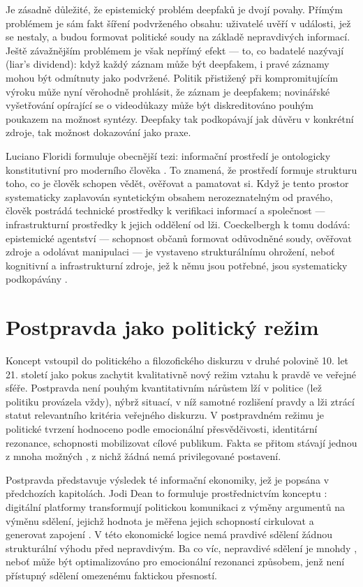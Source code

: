 Je zásadně důležité, že epistemický problém deepfaků je dvojí povahy.
Přímým problémem je sám fakt šíření podvrženého obsahu: uživatelé uvěří v události, jež se nestaly, a budou formovat politické soudy na základě nepravdivých informací. Ještě závažnějším problémem je však nepřímý efekt — to, co badatelé nazývají  (liar's dividend): když každý záznam může být deepfakem, i pravé záznamy mohou být odmítnuty jako podvržené. Politik přistižený při kompromitujícím výroku může nyní věrohodně prohlásit, že záznam je deepfakem; novinářské vyšetřování opírající se o videodůkazy může být diskreditováno pouhým poukazem na možnost syntézy. Deepfaky tak podkopávají jak důvěru v konkrétní zdroje, tak možnost dokazování jako praxe.

Luciano Floridi formuluje obecnější tezi: informační prostředí je ontologicky konstitutivní pro moderního člověka \parencite{Floridi23}. To znamená, že prostředí formuje strukturu toho, co je člověk schopen vědět, ověřovat a pamatovat si. Když je tento prostor systematicky zaplavován syntetickým obsahem nerozeznatelným od pravého, člověk postrádá technické prostředky k verifikaci informací a společnost — infrastrukturní prostředky k jejich oddělení od lži. Coeckelbergh k tomu dodává: epistemické agentství — schopnost občanů formovat odůvodněné soudy, ověřovat zdroje a odolávat manipulaci — je vystaveno strukturálnímu ohrožení, neboť kognitivní a infrastrukturní zdroje, jež k němu jsou potřebné, jsou systematicky podkopávány \parencite{Coeckelbergh23}.

\section{Postpravda jako politický režim}

Koncept  vstoupil do politického a filozofického diskurzu v druhé polovině 10. let 21. století jako pokus zachytit kvalitativně nový režim vztahu k pravdě ve veřejné sféře. Postpravda není pouhým kvantitativním nárůstem lží v politice (lež politiku provázela vždy), nýbrž situací, v níž samotné rozlišení pravdy a lži ztrácí statut relevantního kritéria veřejného diskurzu. V postpravdném režimu je politické tvrzení hodnoceno podle emocionální přesvědčivosti, identitární rezonance, schopnosti mobilizovat cílové publikum. Fakta se přitom stávají jednou z mnoha možných , z nichž žádná nemá privilegované postavení.

Postpravda představuje výsledek té informační ekonomiky, jež je popsána v předchozích kapitolách. Jodi Dean to formuluje prostřednictvím konceptu : digitální platformy transformují politickou komunikaci z výměny argumentů na výměnu sdělení, jejichž hodnota je měřena jejich schopností cirkulovat a generovat zapojení \parencite{Dean09}. V této ekonomické logice nemá pravdivé sdělení žádnou strukturální výhodu před nepravdivým. Ba co víc, nepravdivé sdělení je mnohdy , neboť může být optimalizováno pro emocionální rezonanci způsobem, jenž není přístupný sdělení omezenému faktickou přesností.

